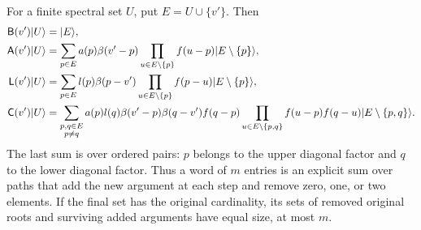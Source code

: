 \begin{lemma}\label{lem:finite-actions}
For a finite spectral set $U$, put $E=U\cup\{v'\}$.  Then
\begin{align}
 \mathsf B(v')|U\rangle&=|E\rangle,\notag\\
 \mathsf A(v')|U\rangle
 &=\sum_{p\in E}a(p)\beta(v'-p)
          \prod_{u\in E\setminus\{p\}}f(u-p)
             |E\setminus\{p\}\rangle,\label{eq:A-action}\\
 \mathsf L(v')|U\rangle
 &=\sum_{p\in E}l(p)\beta(p-v')
          \prod_{u\in E\setminus\{p\}}f(p-u)
             |E\setminus\{p\}\rangle,\label{eq:L-action}\\
 \mathsf C(v')|U\rangle
 &=\sum_{\substack{p,q\in E\\p\ne q}}
       a(p)l(q)\beta(v'-p)\beta(q-v')f(q-p)
       \prod_{u\in E\setminus\{p,q\}}f(u-p)f(q-u)
             |E\setminus\{p,q\}\rangle.\label{eq:C-action}
\end{align}
The last sum is over ordered pairs: $p$ belongs to the upper diagonal
factor and $q$ to the lower diagonal factor.  Thus a word of $m$ entries
is an explicit sum over paths that add the new argument at each step
and remove zero, one, or two elements.  If the final set has the
original cardinality, its sets of removed original roots and surviving
added arguments have equal size, at most $m$.
\end{lemma}

